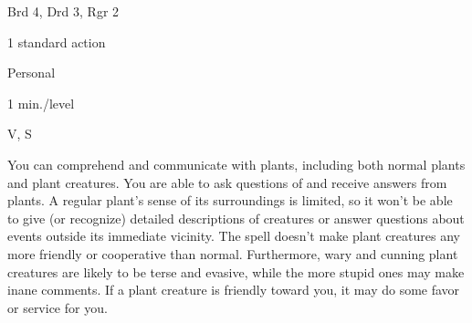 
\begin{description*}
\item[Level:] Brd 4, Drd 3, Rgr 2
\item[Casting Time:] 1 standard action
\item[Range:] Personal
\item[Duration:] 1 min./level
\item[Components:] V, S
\end{description*}

You can comprehend and communicate with plants, including both normal plants and
plant creatures. You are able to ask questions of and receive answers from plants.
A regular plant's sense of its surroundings is limited, so it won't be able to
give (or recognize) detailed descriptions of creatures or answer questions about
events outside its immediate vicinity.
The spell doesn't make plant creatures any more friendly or cooperative than normal.
Furthermore, wary and cunning plant creatures are likely to be terse and evasive,
while the more stupid ones may make inane comments. If a plant creature is friendly
toward you, it may do some favor or service for you.